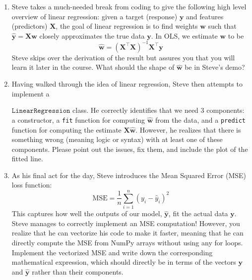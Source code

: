 \documentclass{harvardml}
\theoremstyle{definition}
\theoremstyle{plain}
\begin{document}
\begin{problem} 
\begin{enumerate}
    Hint: check the documentation for \texttt{np.hstack}. 

    \item Steve takes a much-needed break from coding to give the following high level overview of linear regression: given a target (response) $\bm y$ and features (predictors) $\bm X$, the goal of linear regression is to find weights $\bm w$ such that $\bm{\hat y} = \bm X \bm w$ closely approximates the true data $\bm y$. In OLS, we estimate $\bm w$ to be
    \[\bm{\hat w} = (\bm X^\top \bm X)^{-1}\bm X^\top \bm y\]
    Steve skips over the derivation of the result but assures you that you will learn it later in the course. What should the shape of $\bm{\hat w}$ be in Steve's demo?

    \item Having walked through the idea of linear regression, Steve then attempts to implement a 
    
    $\texttt{LinearRegression}$ class. He correctly identifies that we need 3 components: a constructor, a \texttt{fit} function for computing $\hat{\bm w}$ from the data, and a \texttt{predict} function for computing the estimate $\bm X \hat{\bm w}$. However, he realizes that there is something wrong (meaning logic or syntax) with at least one of these components. Please point out the issues, fix them, and include the plot of the fitted line.

    \item As his final act for the day, Steve introduces the Mean Squared Error (MSE) loss function:
    \[\text{MSE} = \frac{1}{n}\sum_{i=1}^{n}(y_i - \hat y_i)^2\]
    This captures how well the outputs of our model, $\bm{\hat y}$, fit the actual data $\bm y$. Steve manages to correctly implement an MSE computation! However, you realize that he can vectorize his code to make it faster, meaning that he can directly compute the MSE from NumPy arrays without using any for loops. Implement the vectorized MSE and write down the corresponding mathematical expression, which should directly be in terms of the vectors $\bm y$ and $\hat{\bm y}$ rather than their components.
    
\end{enumerate}

\end{problem}
\end{document}
